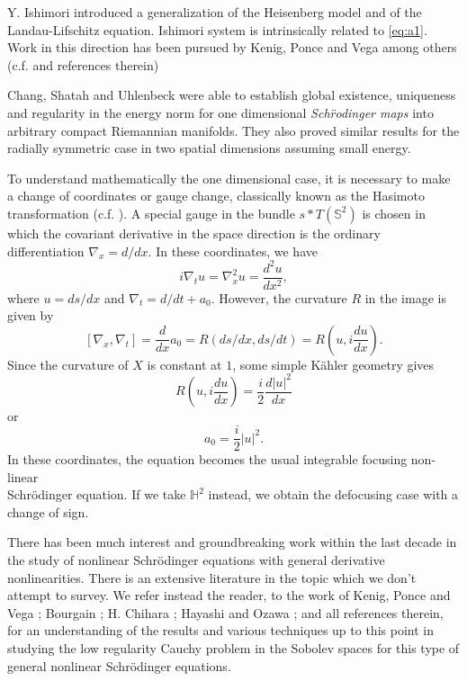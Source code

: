 \documentclass[draft,11pt,leqno]{amsart}
\newcommand{\stwo}{\mathbb S^2}
\newcommand{\f}{\displaystyle\frac}
\begin{document}
\vspace{ .05cm}

Y. Ishimori \cite{Ishimori} 
introduced a generalization of the Heisenberg model and of the Landau-Lifschitz equation. Ishimori system is intrinsically related to \eqref{eq:a1}. Work in this direction has been pursued by Kenig, Ponce and Vega among others (c.f. \cite{KPV} and references therein)

\vspace{ .1cm}

Chang, Shatah and Uhlenbeck were able to establish global existence, 
uniqueness and regularity in the energy norm 
for one dimensional {\it Sch\"rodinger maps} into 
arbitrary compact Riemannian manifolds. They also proved
 similar results for the radially symmetric case in two spatial
dimensions assuming small energy. 

To understand mathematically the one dimensional case, it is necessary to 
make a change of coordinates or gauge change, 
classically known as the Hasimoto 
transformation (c.f. \cite{Hasimoto}). A special gauge in the bundle $s*T(\stwo)$ is chosen in which 
the covariant derivative in the space direction is the ordinary 
differentiation $\nabla_x=d/dx$. In these coordinates, we have
$$
i\nabla_tu=\nabla_x^2u= \f{d^2u}{dx^2},
$$
where $u=ds/dx$ and $\nabla_t=d/dt+a_0$.  However, the curvature $R$ in the
image is given 
by 
$$
[\nabla_x,\nabla_t]=\f{d}{dx} a_0=R(ds/dx,ds/dt)=R(u,i \f{du}{dx}).
$$
Since the curvature of $X$ is constant at $1$, some simple K\"ahler
geometry gives
$$
R(u,i \f{du}{dx})=\f{i}{2} \f{d |u|^2}{dx}
$$
or
$$
a_0=\f{i}{2}|u|^2.
$$
In these coordinates, the equation becomes the usual integrable focusing
non-linear \\ Schr\"odinger equation. If we take ${\mathbb H^2}$ instead, 
we obtain the
defocusing case with a change of sign.

There has been much interest and groundbreaking work within the last
decade in the study of nonlinear Schr\"odinger equations with general derivative nonlinearities. There
is an extensive literature in the topic which we don't attempt to
survey. We refer instead the reader, to the work of 
Kenig, Ponce and Vega \cite{ KPV1} \cite{KPV3} \cite{KPV}; 
Bourgain \cite{Bourgain1} \cite{Bourgain}; 
H. Chihara \cite{Chihara1} \cite{Chihara2}; Hayashi and
Ozawa \cite{Hayashi}; and all references therein, 
for an understanding of the results and various 
techniques up to this point in studying the low regularity Cauchy
problem in the Sobolev spaces for this type of general nonlinear Schr\"odinger equations.    
\end{document}
